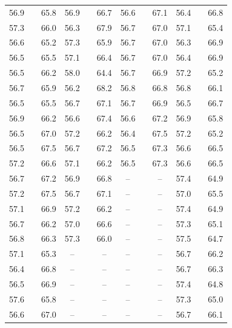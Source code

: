 \documentclass[10pt,twocolumn]{article}
\begin{document}
\begin{table}[h]
\begin{tabular}{ccc@{\hspace{9pt}}ccc@{\hspace{9pt}}ccc@{\hspace{9pt}}ccc}
56.9 &  & 65.8 & 56.9 &  & 66.7 & 56.6 &  & 67.1 & 56.4 &  & 66.8 \\
57.3 &  & 66.0 & 56.3 &  & 67.9 & 56.7 &  & 67.0 & 57.1 &  & 65.4 \\
56.6 &  & 65.2 & 57.3 &  & 65.9 & 56.7 &  & 67.0 & 56.3 &  & 66.9 \\
56.5 &  & 65.5 & 57.1 &  & 66.4 & 56.7 &  & 67.0 & 56.4 &  & 66.9 \\
56.5 &  & 66.2 & 58.0 &  & 64.4 & 56.7 &  & 66.9 & 57.2 &  & 65.2 \\
56.7 &  & 65.9 & 56.2 &  & 68.2 & 56.8 &  & 66.8 & 56.8 &  & 66.1 \\
56.5 &  & 65.5 & 56.7 &  & 67.1 & 56.7 &  & 66.9 & 56.5 &  & 66.7 \\
56.9 &  & 66.2 & 56.6 &  & 67.4 & 56.6 &  & 67.2 & 56.9 &  & 65.8 \\
56.5 &  & 67.0 & 57.2 &  & 66.2 & 56.4 &  & 67.5 & 57.2 &  & 65.2 \\
56.5 &  & 67.5 & 56.7 &  & 67.2 & 56.5 &  & 67.3 & 56.6 &  & 66.5 \\
57.2 &  & 66.6 & 57.1 &  & 66.2 & 56.5 &  & 67.3 & 56.6 &  & 66.5 \\
56.7 &  & 67.2 & 56.9 &  & 66.8 & -- &  & -- & 57.4 &  & 64.9 \\
57.2 &  & 67.5 & 56.7 &  & 67.1 & -- &  & -- & 57.0 &  & 65.5 \\
57.1 &  & 66.9 & 57.2 &  & 66.2 & -- &  & -- & 57.4 &  & 64.9 \\
56.7 &  & 66.2 & 57.0 &  & 66.6 & -- &  & -- & 57.3 &  & 65.1 \\
56.8 &  & 66.3 & 57.3 &  & 66.0 & -- &  & -- & 57.5 &  & 64.7 \\
57.1 &  & 65.3 & -- &  & -- & -- &  & -- & 56.7 &  & 66.2 \\
56.4 &  & 66.8 & -- &  & -- & -- &  & -- & 56.7 &  & 66.3 \\
56.5 &  & 66.9 & -- &  & -- & -- &  & -- & 57.4 &  & 64.8 \\
57.6 &  & 65.8 & -- &  & -- & -- &  & -- & 57.3 &  & 65.0 \\
56.6 &  & 67.0 & -- &  & -- & -- &  & -- & 56.7 &  & 66.1 \\
\bottomrule
\end{tabular}
\end{table}
\end{document}
